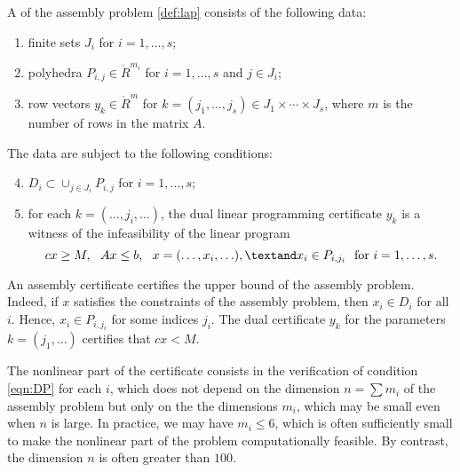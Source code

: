 \begin{definition}
A  of the assembly problem \eqref{def:lap}
consists of the following data:
\begin{enumerate}
\item finite sets $J_i$ for $i=1,\ldots,s$;
\item polyhedra $P_{i,j}\in\ring{R}^{m_i}$ for $i=1,\ldots,s$ and $j\in J_i$;
\item row vectors $y_k\in\ring{R}^m$ for $k=(j_1,\ldots,j_s)\in J_1\times\cdots\times J_s$,
  where $m$ is the number of rows in the matrix $A$.
\end{enumerate}
The data are subject to the following conditions:
\begin{enumerate}
\setcounter{enumi}{3}
\item \label{eqn:DP}
$D_i \subset\cup_{j\in J_i} P_{i,j}$ for $i=1,\ldots,s$;
\item for each $k=(\ldots,j_i,\ldots)$, the dual linear programming certificate $y_k$
is a witness of the infeasibility of the linear program
\[
c x \ge M,\ \  A x \le b,\ \   x=(\ldots,x_i,\ldots),\textand x_i\in P_{i,j_i}\text{\ \ for\ }  i=1,\ldots,s.
\]
\end{enumerate}
\end{definition}

\begin{remark}
An assembly certificate certifies the upper bound
of the assembly problem.  Indeed, if $x$ satisfies the
constraints of the assembly problem, then $x_i\in D_i$ for all
$i$.  Hence, $x_i\in P_{i,j_i}$ for some indices $j_i$.  The dual
certificate $y_k$ for the parameters $k=(j_1,\ldots)$  certifies that $c x < M$.
\end{remark}

\begin{remark}
The nonlinear part of the certificate consists in the verification
of condition \eqref{eqn:DP} for each $i$, which does not depend on the dimension $n=\sum m_i$
of the assembly problem but only on the
the dimensions $m_i$, which may be small even when $n$ is large.
In practice, we may have $m_i\le 6$, which is often sufficiently small to make the
nonlinear part of the problem computationally feasible.
By contrast,  the dimension $n$ is often greater than $100$.
\end{remark}

